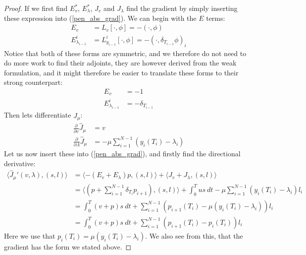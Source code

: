 \begin{proof}
If we first find $E_v^*$, $E_{\lambda}^*$, $J_v$ and $J_{\lambda}$ find the gradient by simply inserting these expression into (\ref{pen_abs_grad}). We can begin with the $E$ terms:
\begin{align*}
E_v &= L_v[\cdot,\phi] = -(\cdot,\phi) \\
E_{\lambda_{i-1}}^i &= L_{y_{i-1}}^i[\cdot,\phi] = -(\cdot,\delta_{T_{i-1}}\phi)_i
\end{align*}
Notice that both of these forms are symmetric, and we therefore do not need to do more work to find their adjoints, they are however derived from the weak formulation, and it might therefore be easier to translate these forms to their strong counterpart:
\begin{align*}
E_v &=-1 \\
E_{\lambda_{i-1}}^i &= -\delta_{T_{i-1}}
\end{align*}
Then lets differentiate $\hat J_{\mu}$:
\begin{align*}
\frac{\partial}{\partial v}\hat J_{\mu} &= v \\
\frac{\partial}{\partial \Lambda}\hat J_{\mu} &= - \mu \sum_{i=1}^{N-1}(y_{i}(T_i)-\lambda_i)
\end{align*}
Let us now insert these into (\ref{pen_abs_grad}), and firstly find the directional derivative:
\begin{align*}
\langle \hat J_{\mu}'(v,\lambda), (s,l)\rangle&=\langle -(E_v+E_{\lambda})p, (s,l)\rangle + \langle J_v+J_{\lambda}, (s,l)\rangle \\
&= \langle (p+\sum_{i=1}^{N-1} \delta_{T_i}p_{i+1}) , (s,l)\rangle+ \int_0^T us \ dt - \mu \sum_{i=1}^{N-1}(y_{i}(T_i)-\lambda_i)l_i\\
&=\int_0^T (v+p)s \ dt +\sum_{i=1}^{N-1}(p_{i+1}(T_i) -\mu(y_{i}(T_i)-\lambda_i) )l_i \\
&= \int_0^T (v+p)s \ dt +\sum_{i=1}^{N-1}(p_{i+1}(T_i) -p_{i}(T_i) )l_i
\end{align*} 
Here we use that $p_i(T_i) = \mu(y_{i}(T_i)-\lambda_i)$. We also see from this, that the gradient has the form we stated above.
\end{proof} 
